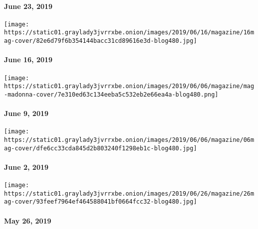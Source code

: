 \hypertarget{june-23-2019}{%
\paragraph{June 23, 2019}\label{june-23-2019}}

\href{https://www.nytimes3xbfgragh.onion/issue/magazine/2019/06/25/the-61619-issue}{}

\texttt{[image: https://static01.graylady3jvrrxbe.onion/images/2019/06/16/magazine/16mag-cover/82e6d79f6b354144bacc31cd89616e3d-blog480.jpg]}

\hypertarget{june-16-2019}{%
\paragraph{June 16, 2019}\label{june-16-2019}}

\href{https://www.nytimes3xbfgragh.onion/issue/magazine/2019/06/25/the-6919-issue}{}

\texttt{[image: https://static01.graylady3jvrrxbe.onion/images/2019/06/06/magazine/mag-madonna-cover/7e310ed63c134eeba5c532eb2e66ea4a-blog480.png]}

\hypertarget{june-9-2019}{%
\paragraph{June 9, 2019}\label{june-9-2019}}

\href{https://www.nytimes3xbfgragh.onion/issue/magazine/2019/06/06/the-60219-issue}{}

\texttt{[image: https://static01.graylady3jvrrxbe.onion/images/2019/06/06/magazine/06mag-cover/dfe6cc33cda845d2b803240f1298eb1c-blog480.jpg]}

\hypertarget{june-2-2019}{%
\paragraph{June 2, 2019}\label{june-2-2019}}

\href{https://www.nytimes3xbfgragh.onion/issue/magazine/2019/06/06/the-52619-issue}{}

\texttt{[image: https://static01.graylady3jvrrxbe.onion/images/2019/06/26/magazine/26mag-cover/93feef7964ef464588041bf0664fcc32-blog480.jpg]}

\hypertarget{may-26-2019}{%
\paragraph{May 26, 2019}\label{may-26-2019}}

